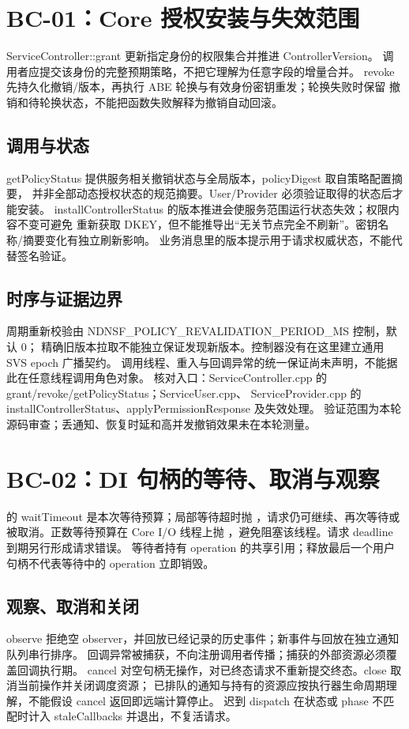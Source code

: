 \clearpage
\section{BC-01：Core 授权安装与失效范围}
ServiceController::grant 更新指定身份的权限集合并推进 ControllerVersion。
调用者应提交该身份的完整预期策略，不把它理解为任意字段的增量合并。
revoke 先持久化撤销/版本，再执行 ABE 轮换与有效身份密钥重发；轮换失败时保留
撤销和待轮换状态，不能把函数失败解释为撤销自动回滚。

\subsection{调用与状态}
getPolicyStatus 提供服务相关撤销状态与全局版本，policyDigest 取自策略配置摘要，
并非全部动态授权状态的规范摘要。User/Provider 必须验证取得的状态后才能安装。
installControllerStatus 的版本推进会使服务范围运行状态失效；权限内容不变可避免
重新获取 DKEY，但不能推导出“无关节点完全不刷新”。密钥名称/摘要变化有独立刷新影响。
业务消息里的版本提示用于请求权威状态，不能代替签名验证。

\subsection{时序与证据边界}
周期重新校验由 NDNSF\_POLICY\_REVALIDATION\_PERIOD\_MS 控制，默认 0；
精确旧版本拉取不能独立保证发现新版本。控制器没有在这里建立通用 SVS epoch 广播契约。
调用线程、重入与回调异常的统一保证尚未声明，不能据此在任意线程调用角色对象。
核对入口：ServiceController.cpp 的 grant/revoke/getPolicyStatus；ServiceUser.cpp、
ServiceProvider.cpp 的 installControllerStatus、applyPermissionResponse 及失效处理。
验证范围为本轮源码审查；丢通知、恢复时延和高并发撤销效果未在本轮测量。

\section{BC-02：DI 句柄的等待、取消与观察}
 的 waitTimeout 是本次等待预算；局部等待超时抛
，请求仍可继续、再次等待或被取消。正数等待预算在 Core I/O
线程上抛 ，避免阻塞该线程。请求 deadline 到期另行形成请求错误。
等待者持有 operation 的共享引用；释放最后一个用户句柄不代表等待中的 operation 立即销毁。

\subsection{观察、取消和关闭}
observe 拒绝空 observer，并回放已经记录的历史事件；新事件与回放在独立通知队列串行排序。
回调异常被捕获，不向注册调用者传播；捕获的外部资源必须覆盖回调执行期。
cancel 对空句柄无操作，对已终态请求不重新提交终态。close 取消当前操作并关闭调度资源；
已排队的通知与持有的资源应按执行器生命周期理解，不能假设 cancel 返回即远端计算停止。
迟到 dispatch 在状态或 phase 不匹配时计入 staleCallbacks 并退出，不复活请求。

